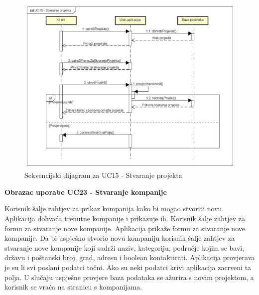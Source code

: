 				\begin{figure}[H]
					\includegraphics[scale=0.3]{slike/Sekvencijski dijagrami/UC15 - Stvaranje projekta}
					\centering
					\caption{Sekvencijski dijagram za UC15 - Stvaranje projekta}
					\label{fig:UC15}
				\end{figure}

				\textbf{Obrazac uporabe UC23 - Stvaranje kompanije}\vspace{0.1cm}

				{Korisnik šalje zahtjev za prikaz kompanija kako bi mogao stvoriti novu. Aplikacija dohvaća trenutne kompanije i prikazuje ih. Korisnik šalje zahtjev za formu za stvaranje nove kompanije. Aplikacija prikaže formu za stvaranje nove kompanije. Da bi uspješno  stvorio novu kompaniju korisnik šalje zahtjev za stvaranje nove kompanije koji sadrži naziv, kategoriju, područje kojim se bavi, državu i poštanski broj, grad, adresu i boolean kontaktirati. Aplikacija provjerava je su li svi poslani podatci točni. Ako su neki podatci krivi aplikacija zacrveni ta polja. U slučaju uspješne provjere baza podataka se ažurira s novim projektom, a korisnik se vraća na stranicu s kompanijama.}

